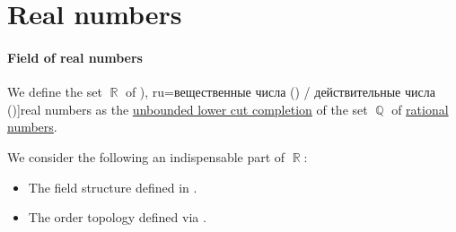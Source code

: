 \section{Real numbers}\label{sec:real_numbers}

\paragraph{Field of real numbers}

\begin{definition}\label{def:real_numbers}
  We define the set \( \BbbR \) of \term[bg=реални числа (\cite[ch. I]{Тагамлицки1971Диф}), ru=вещественные числа (\cite[\S 3]{Фихтенгольц1968ОсновыТом1}) / действительные числа (\cite[def. 25.1]{АлександровМаркушевичХинчин1951ЭнциклопедияТом1})]{real numbers} as the \hyperref[def:lower_cut_completion]{unbounded lower cut completion} of the set \( \BbbQ \) of \hyperref[def:rational_numbers]{rational numbers}.
\end{definition}
\begin{comments}
  \item We consider the following an indispensable part of \( \BbbR \):
  \begin{itemize}
    \item The field structure defined in .
    \item The order topology defined via .
  \end{itemize}
\end{comments}

